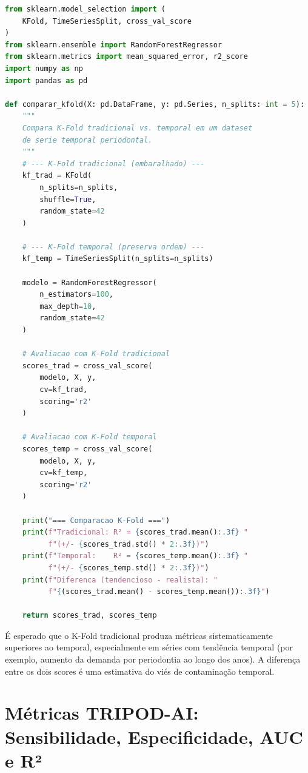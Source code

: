\begin{lstlisting}[language=Python, caption={Comparação entre
K-Fold tradicional e temporal com scikit-learn},
label={lst:kfold_comparison}]
from sklearn.model_selection import (
    KFold, TimeSeriesSplit, cross_val_score
)
from sklearn.ensemble import RandomForestRegressor
from sklearn.metrics import mean_squared_error, r2_score
import numpy as np
import pandas as pd

def comparar_kfold(X: pd.DataFrame, y: pd.Series, n_splits: int = 5):
    """
    Compara K-Fold tradicional vs. temporal em um dataset
    de serie temporal periodontal.
    """
    # --- K-Fold tradicional (embaralhado) ---
    kf_trad = KFold(
        n_splits=n_splits,
        shuffle=True,
        random_state=42
    )
    
    # --- K-Fold temporal (preserva ordem) ---
    kf_temp = TimeSeriesSplit(n_splits=n_splits)
    
    modelo = RandomForestRegressor(
        n_estimators=100,
        max_depth=10,
        random_state=42
    )
    
    # Avaliacao com K-Fold tradicional
    scores_trad = cross_val_score(
        modelo, X, y,
        cv=kf_trad,
        scoring='r2'
    )
    
    # Avaliacao com K-Fold temporal
    scores_temp = cross_val_score(
        modelo, X, y,
        cv=kf_temp,
        scoring='r2'
    )
    
    print("=== Comparacao K-Fold ===")
    print(f"Tradicional: R² = {scores_trad.mean():.3f} "
          f"(+/- {scores_trad.std() * 2:.3f})")
    print(f"Temporal:    R² = {scores_temp.mean():.3f} "
          f"(+/- {scores_temp.std() * 2:.3f})")
    print(f"Diferenca (tendencioso - realista): "
          f"{(scores_trad.mean() - scores_temp.mean()):.3f}")
    
    return scores_trad, scores_temp
\end{lstlisting}

É esperado que o K-Fold tradicional produza métricas
sistematicamente superiores ao temporal, especialmente em séries com
tendência temporal (por exemplo, aumento da demanda por periodontia
ao longo dos anos). A diferença entre os dois scores é uma estimativa
do viés de contaminação temporal.

\section{Métricas TRIPOD-AI: Sensibilidade, Especificidade, AUC e
\texorpdfstring{R²}{R2}}


